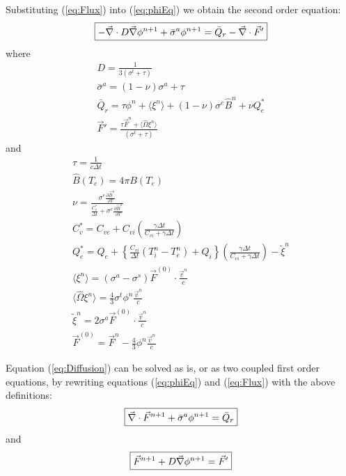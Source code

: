 \documentclass{article}
\newcommand{\dt}{\ensuremath{\Delta t}}
\newcommand{\cviOdt}{\ensuremath{\frac{C_{vi}}{\dt}}}
\newcommand{\Cvs}{\ensuremath{C_{v}^{*}}}
\newcommand{\Bn}{\ensuremath{\hat{B}^{n}}}
\newcommand{\pBndT}{\ensuremath{\frac{\partial\Bn}{\partial T}}}
\begin{document}
Substituting (\ref{eq:Flux}) into (\ref{eq:phiEq}) we obtain
the second order equation:
\begin{equation}
   \boxed{
         - \vec{\nabla} \cdot D \vec{\nabla} \phi^{n+1} +  \bar{\sigma}^{a} \phi^{n+1}
                = \bar{Q}_{r} - \vec{\nabla} \cdot \vec{F}'
         }
\label{eq:Diffusion}
\end{equation}
where
\begin{gather}
        D = \frac{1}{3(\sigma^{t} + \tau) } 
  \label{eq:quant_i}
  \\
        \bar{\sigma}^{a} = (1 - \nu) \sigma^{a} + \tau 
  \\
        \bar{Q}_{r} =\tau \phi^{n}
                + \langle \xi^{n} \rangle
                + (1 - \nu) \sigma^{e} \Bn  + \nu Q_{e}^{*} 
  \\
        \vec{F}' = \frac{\tau \vec{F}^{n}
                        + \langle \hat{\Omega} \xi^{n} \rangle}
               {(\sigma^{t} + \tau)}
\end{gather}
and
\begin{gather}
        \tau = \frac{1}{c\dt}
  \\
        \hat{B}(T_{e}) = 4\pi B(T_{e})
  \\
        \nu = \frac{\sigma^{e} \pBndT } {\frac{\Cvs}{\dt} + \sigma^{e}\pBndT}
  \\
        \Cvs = C_{ve} + C_{vi} \left(\frac{\gamma\dt}{C_{vi}+\gamma\dt}\right)
  \\
        Q_{e}^{*} = Q_{e} + \left\{ \cviOdt (T_{i}^{n} - T_{e}^{n}) +
                                Q_{i} \right\}
                \left(\frac{\gamma\dt}{C_{vi}+\gamma\dt}\right) -
                \tilde{\xi}^{n}
  \\
        \langle \xi^{n} \rangle =
                        (\sigma^{a} - \sigma^{s}) \vec{F}^{(0)}
                        \cdot \frac{\vec{v}^{n}}{c}
  \\
        \langle \hat{\Omega} \xi^{n} \rangle =
                \frac{4}{3} \sigma^{t} \phi^{n} \frac{\vec{v}^{n}}{c}
  \\
        \tilde{\xi}^{n} = 2 \sigma^{a} \vec{F}^{(0)} \cdot
                                \frac{\vec{v}^{n}}{c}
  \\
        \vec{F}^{(0)} = \vec{F}^{n} - \frac{4}{3} \phi^{n}
                                                \frac{\vec{v}^{n}}{c}
  \label{eq:quant_f}
\end{gather}

Equation (\ref{eq:Diffusion}) can be solved as is,
or as two coupled first order equations,
by rewriting equations (\ref{eq:phiEq}) and (\ref{eq:Flux}) with the above
definitions:
\begin{equation}
   \boxed{
        \vec{\nabla} \cdot \vec{F}^{n+1} + \bar{\sigma}^{a} \phi^{n+1}
                = \bar{Q}_{r}
         }
\label{eq:phi2}
\end{equation}
and
\begin{equation}
   \boxed{
        \vec{F}^{n+1} + D \vec{\nabla} \phi^{n+1} =  \vec{F}'
         }
\label{eq:Flux2}
\end{equation}
\end{document}

